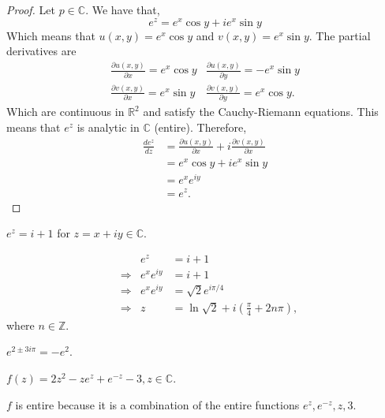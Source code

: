 \documentclass[12pt]{book}
\begin{document}
\begin{proof}
    Let $p \in \mathbb{C}.$ We have that,
    \[
        e^{z} = e^{x}\cos y + ie^{x}\sin y
    \]
    Which means that $u(x, y) = e^{x}\cos y$ and $v(x, y) = e^{x}\sin y$. The partial derivatives are
    \[
        \begin{array}{cc}
            \frac{\partial u(x, y)}{\partial x} = e^{x}\cos y & \frac{\partial u(x, y)}{\partial y} = -e^{x}\sin y \\
            \frac{\partial v(x, y)}{\partial x} = e^{x}\sin y & \frac{\partial v(x, y)}{\partial y} = e^{x}\cos y.
        \end{array}
    \]
    Which are continuous in $\mathbb{R}^{2}$ and satisfy the Cauchy-Riemann equations. This means that $e^{z}$ is analytic in $\mathbb{C}$ (entire). Therefore,
    \begin{align*}
        \frac{d e^{z}}{d z}
            &=
               \frac{\partial u(x, y)}{\partial x} + i \frac{\partial v(x, y)}{\partial x} \\
            &= 
                e^{x}\cos y + ie^{x} \sin y\\
            &=
                e^{x}e^{iy} \\
            &=
                e^{z}.
    \end{align*}
\end{proof}

\begin{exmp}
    $e^{z} = i + 1$ for $z = x + iy \in \mathbb{C}$.
\end{exmp}
\begin{align*}
    &&e^{z}
        &=
            i + 1 \\
    &\Rightarrow &e^{x}e^{iy}
        &=
            i + 1 \\
    &\Rightarrow &e^{x}e^{iy}
        &=
            \sqrt{2}e^{i\pi/4} \\
    &\Rightarrow &z
        &=
            \ln \sqrt{2} + i \left(\frac{\pi}{4} + 2n\pi\right),
\end{align*}
where $n \in \mathbb{Z}.$

\begin{exmp}
    $e^{2 \pm 3i\pi} = -e^{2}.$
\end{exmp}

\begin{exmp}
    $f(z) = 2z^2 - ze^{z} + e^{-z} - 3, z \in \mathbb{C}.$
\end{exmp}
$f$ is entire because it is a combination of the entire functions $e^{z}, e^{-z}, z, 3$.
\end{document}
